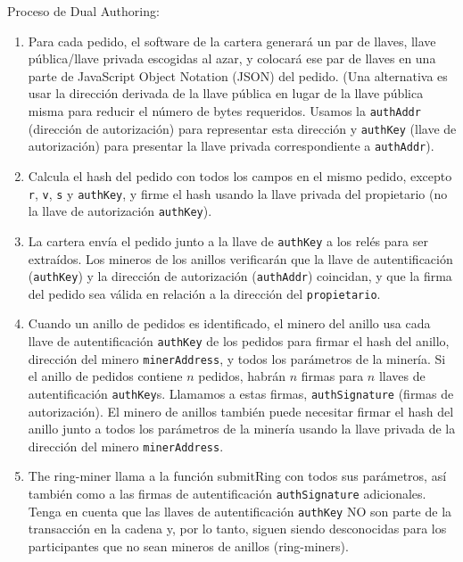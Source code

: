 \documentclass[UTF8,nofonts]{article}
\begin{document}
\begin{multicols}{2}
Proceso de Dual Authoring:
\begin{enumerate}
	\item Para cada pedido, el software de la cartera generar\'a un par de llaves, llave p\'ublica/llave privada escogidas al azar, y colocar\'a ese par de llaves en una parte de JavaScript Object Notation (JSON) del pedido. (Una alternativa es usar la direcci\'on derivada de la llave p\'ublica en lugar de la llave p\'ublica misma para reducir el n\'umero de bytes requeridos. Usamos la \verb|authAddr| (direcci\'on de autorizaci\'on) para representar esta direcci\'on y \verb|authKey| (llave de autorizaci\'on) para presentar la llave privada correspondiente a \verb|authAddr|).
    \item Calcula el hash del pedido con todos los campos en el mismo pedido, excepto \verb|r|, \verb|v|, \verb|s| y \verb|authKey|, y firme el hash usando la llave privada del propietario (no la llave de autorizaci\'on \verb|authKey|).

    \item La cartera env\'ia el pedido junto a la llave de \verb|authKey| a los rel\'es para ser extra\'idos. Los mineros de los anillos verificar\'an que la llave de autentificaci\'on (\verb|authKey|) y la direcci\'on de autorizaci\'on (\verb|authAddr|) coincidan, y que la firma del pedido sea v\'alida en relaci\'on a la direcci\'on del \verb|propietario|. %


	\item Cuando un anillo de pedidos es identificado, el minero del anillo usa cada llave de autentificaci\'on \verb|authKey| de los pedidos para firmar el hash del anillo, direcci\'on del minero \verb|minerAddress|, y todos los par\'ametros de la miner\'ia. Si el anillo de pedidos contiene $n$ pedidos, habr\'an $n$ firmas para $n$ llaves de autentificaci\'on \verb|authKey|s. Llamamos a estas firmas, \verb|authSignature| (firmas de autorizaci\'on). El minero de anillos tambi\'en puede necesitar firmar el hash del anillo junto a todos los par\'ametros de la miner\'ia usando la llave privada de la direcci\'on del minero  \verb|minerAddress|.

	\item The ring-miner llama a la funci\'on submitRing con todos sus par\'ametros, as\'i tambi\'en como a las firmas de autentificaci\'on \verb|authSignature| adicionales. Tenga en cuenta que las llaves de autentificaci\'on \verb|authKey| NO son parte de la transacci\'on en la cadena y, por lo tanto, siguen siendo desconocidas para los participantes que no sean mineros de anillos (ring-miners).


\end{enumerate}
\end{multicols}
\end{document}
